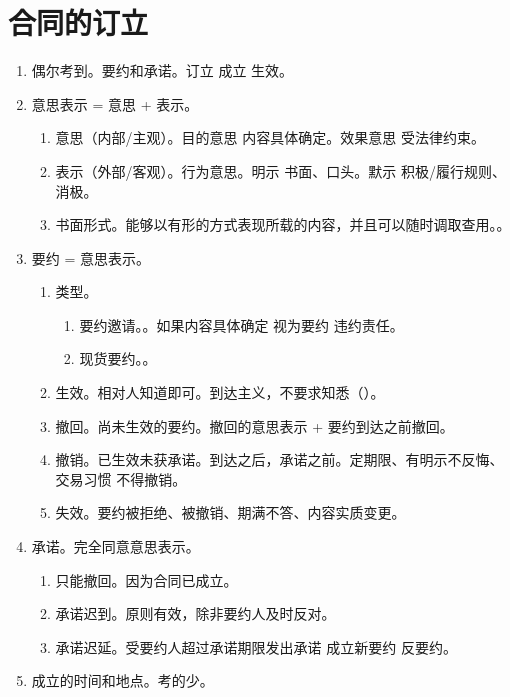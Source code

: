 \section{合同的订立}
\begin{enumerate}
  \item 偶尔考到。要约和承诺。订立 \bdy 成立 \bdy 生效。
  \item 意思表示 = 意思 + 表示。
        \begin{enumerate}
          \item 意思（内部/主观）。\yi 目的意思 \yjt 内容具体确定。\er 效果意思 \yjt 受法律约束。
          \item 表示（外部/客观）。行为意思。\yi 明示 \yjt 书面、口头。\er 默示 \yjt 积极/履行规则、消极。
          \item 书面形式。能够以有形的方式表现所载的内容，并且可以随时调取查用。。
        \end{enumerate}
  \item 要约 = 意思表示。
        \begin{enumerate}
          \item 类型。
                \begin{enumerate}
                  \item 要约邀请。。如果内容具体确定 \yjt 视为要约 \yjt 违约责任。
                  \item 现货要约。。
                \end{enumerate}
          \item 生效。相对人知道即可。到达主义，不要求知悉（）。
          \item 撤回。尚未生效的要约。撤回的意思表示 + 要约到达之前撤回。
          \item 撤销。已生效未获承诺。到达之后，承诺之前。定期限、有明示不反悔、交易习惯 \yjt 不得撤销。
          \item 失效。要约被拒绝、被撤销、期满不答、内容实质变更。
        \end{enumerate}
  \item 承诺。完全同意意思表示。
        \begin{enumerate}
          \item 只能撤回。因为合同已成立。
          \item 承诺迟到。原则有效，除非要约人及时反对。
          \item 承诺迟延。受要约人超过承诺期限发出承诺 \yjt 成立新要约 \hz 反要约。
        \end{enumerate}
  \item 成立的时间和地点。考的少。

\end{enumerate}
